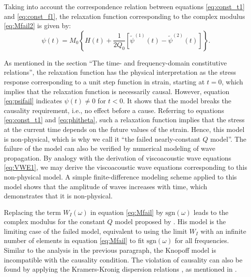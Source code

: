 \documentclass[article]{./macros/elsarticle_qh}
\begin{document}
Taking into account the correspondence relation between equations \ref{eq:const_t1} and \ref{eq:const_f1}, the relaxation function corresponding to the complex modulus \ref{eq:Mfail2} is given by:
\begin{equation} \label{eq:psifail}
\psi(t) = M_{0} \left \{
H(t) + \frac{1}{2Q_{0}} \left[
\tilde{\psi}^{(1)}(t) - \tilde{\psi}^{(2)}(t)
\right]
\right \} .
\end{equation}

As mentioned in the section ``The time- and frequency-domain constitutive relations'', the relaxation function has the physical interpretation as the stress response corresponding to a unit step function in strain, starting at $t=0$, which implies that the relaxation function is necessarily causal. However, equation \ref{eq:psifail} indicates $\psi(t) \neq 0$ for $t < 0$. It shows that the model breaks the causality requirement, i.e., no effect before a cause. 
Referring to equations \ref{eq:const_t1} and \ref{eq:phitheta}, such a relaxation function implies that the stress at the current time depends on the future values of the strain. Hence, this model is non-physical, which is why we call it ``the failed nearly-constant $Q$ model''. The failure of the model can also be verified by numerical modeling of wave propagation. By analogy with the derivation of viscoacoustic wave equations \ref{eq:VWE1}, we may derive the viscoacoustic wave equations corresponding to this non-physical model. A simple finite-difference modeling scheme applied to this model shows that the amplitude of waves increases with time, which demonstrates that it is non-physical. 

Replacing the term $W_{I}(\omega)$ in equation \ref{eq:Mfail} by $\text{sgn}(\omega)$ leads to the complex modulus for the constant $Q$ model proposed by \cite{knopoff:1956}. His model is the limiting case of the failed model, equivalent to using the limit $W_{I}$ with an infinite number of elements in equation \ref{eq:Mfail} to fit $\text{sgn}(\omega)$ for all frequencies. Similar to the analysis in the previous paragraph, the Knopoff model is incompatible with the causality condition. The violation of causality can also be found by applying the Kramers-Kronig dispersion relations \cite[e.g.][]{kronig:1926,futterman:1962,carcione:2014}, as mentioned in \cite{knopoff:1964,knopoff:1965}.
\end{document}
